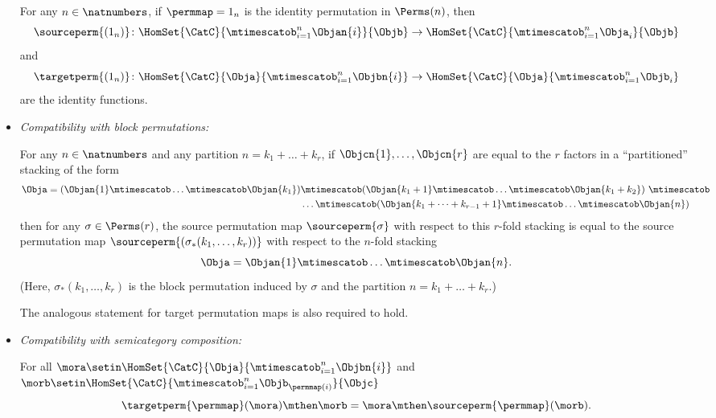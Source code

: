 \begin{ctdefinition}
\begin{itemize}
              For any $n \in \natnumbers$, if $\permmap = 1_n$ is the identity permutation in $\Perms(n)$, then 
              \begin{equation}
                  \label{eq:perm-compatibility-with-perm-identity-1}
                  \sourceperm{(1_n)} \colon \HomSet{\CatC}{\mtimescatob_{i=1}^n \Objan{i}}{\Objb} \to \HomSet{\CatC}{\mtimescatob_{i=1}^n \Obja_{i}}{\Objb}
              \end{equation}
              and 
              \begin{equation}
                  \label{eq:perm-compatibility-with-perm-identity-2}
                  \targetperm{(1_n)} \colon \HomSet{\CatC}{\Obja}{\mtimescatob_{i=1}^n \Objbn{i}} \to \HomSet{\CatC}{\Obja}{\mtimescatob_{i=1}^n \Objb_i}
              \end{equation}
              are the identity functions. 
              
         \item \emph{Compatibility with block permutations:}
         
         For any $n \in \natnumbers$ and any partition $n = k_1 + \dots + k_r$, if $\Objcn{1}, \dots, \Objcn{r}$ are equal to the $r$ factors in a ``partitioned'' stacking of the form
         \begin{align*}
\Obja = (\Objan{1} \mtimescatob \dots \mtimescatob \Objan{k_1}) & \mtimescatob (\Objan{k_1 + 1} \mtimescatob \dots \mtimescatob \Objan{k_1 + k_2}) \  \mtimescatob \\ & \dots \mtimescatob (\Objan{k_1 + \dots + k_{r-1} +1} \mtimescatob \dots \mtimescatob \Objan{n})
\end{align*}
 then for any $\sigma \in \Perms(r)$, the source permutation map $\sourceperm{\sigma}$ with respect to this $r$-fold stacking is equal to the source permutation map $\sourceperm{(\sigma_*(k_1, \dots, k_r))}$ with respect to the $n$-fold stacking
 \begin{equation*}
\Obja = \Objan{1} \mtimescatob \dots \mtimescatob \Objan{n}.
\end{equation*}
(Here, $\sigma_*(k_1, \dots, k_r)$ is the block permutation induced by $\sigma$ and the partition $n = k_1 + \dots + k_r$.)

The analogous statement for target permutation maps is also required to hold. 

                  
        \item \emph{Compatibility with semicategory composition:}

              For all $\mora \setin \HomSet{\CatC}{\Obja}{\mtimescatob_{i=1}^n \Objbn{i}}$ and $\morb \setin \HomSet{\CatC}{\mtimescatob_{i=1}^n \Objb_{\permmap(i)}}{\Objc}$
              \begin{equation}
                  \label{eq:perm-compatibility-with-composition}
                  \targetperm{\permmap} (\mora) \mthen \morb = \mora \mthen \sourceperm{\permmap}(\morb).
              \end{equation}


\end{itemize}
\end{ctdefinition}
